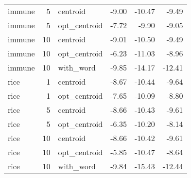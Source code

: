 \documentclass{article}
\begin{document}
\begin{table}[H]
\begin{tabular}{lrlrrr}
  immune &   5 & centroid & -9.00 & -10.47 & -9.49 \\ 
  immune &   5 & opt\_centroid & -7.72 & -9.90 & -9.05 \\ 
  immune &  10 & centroid & -9.01 & -10.50 & -9.49 \\ 
  immune &  10 & opt\_centroid & -6.23 & -11.03 & -8.96 \\ 
  immune &  10 & with\_word & -9.85 & -14.17 & -12.41 \\ 
  rice &   1 & centroid & -8.67 & -10.44 & -9.64 \\ 
  rice &   1 & opt\_centroid & -7.65 & -10.09 & -8.80 \\ 
  rice &   5 & centroid & -8.66 & -10.43 & -9.61 \\ 
  rice &   5 & opt\_centroid & -6.35 & -10.20 & -8.14 \\ 
  rice &  10 & centroid & -8.66 & -10.42 & -9.61 \\ 
  rice &  10 & opt\_centroid & -5.85 & -10.47 & -8.64 \\ 
  rice &  10 & with\_word & -9.84 & -15.43 & -12.44 \\ 
   \hline
\end{tabular}

\end{table}
\end{document}
